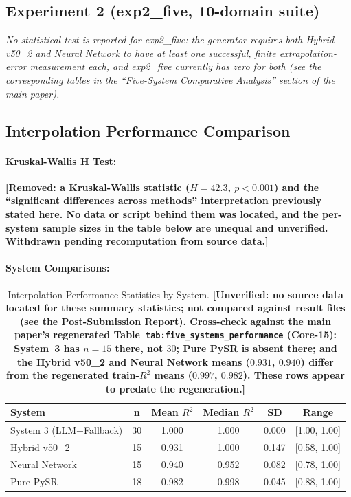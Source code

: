 \documentclass[twoside,11pt]{article}
\begin{document}

\subsection*{Experiment 2 (exp2\_five, 10-domain suite)}

\textit{No statistical test is reported for exp2\_five: the generator requires both Hybrid v50\_2 and Neural Network to have at least one successful, finite extrapolation-error measurement each, and exp2\_five currently has zero for both (see the corresponding tables in the ``Five-System Comparative Analysis'' section of the main paper).}

\subsection{Interpolation Performance Comparison}

\paragraph{Kruskal-Wallis H Test:}
\textbf{[Removed: a Kruskal-Wallis statistic ($H = 42.3$, $p < 0.001$) and the
``significant differences across methods'' interpretation previously stated here.
No data or script behind them was located, and the per-system sample sizes in the
table below are unequal and unverified. Withdrawn pending recomputation from
source data.]}

\paragraph{System Comparisons:}
\begin{table}[H]
\centering
\caption{Interpolation Performance Statistics by System.
  \textbf{[Unverified: no source data located for these summary statistics; not
  compared against result files (see the Post-Submission Report). Cross-check against the
  main paper's regenerated Table~\texttt{tab:five\_systems\_performance} (Core-15): System~3 has
  $n=15$ there, not $30$; Pure PySR is absent there; and the Hybrid v50\_2 and Neural Network
  means ($0.931$, $0.940$) differ from the regenerated train-$R^2$ means ($0.997$, $0.982$).
  These rows appear to predate the regeneration.]}}
\label{tab:interpolation_stats}
\begin{tabular}{lccccc}
\toprule
\textbf{System} & \textbf{n} & \textbf{Mean $R^2$} & \textbf{Median $R^2$} & \textbf{SD} & \textbf{Range} \\
\midrule
System 3 (LLM+Fallback) & 30 & 1.000 & 1.000 & 0.000 & [1.00, 1.00] \\
Hybrid v50\_2 & 15 & 0.931 & 1.000 & 0.147 & [0.58, 1.00] \\
Neural Network & 15 & 0.940 & 0.952 & 0.082 & [0.78, 1.00] \\
Pure PySR & 18 & 0.982 & 0.998 & 0.045 & [0.88, 1.00] \\
\bottomrule
\end{tabular}
\end{table}
\end{document}
